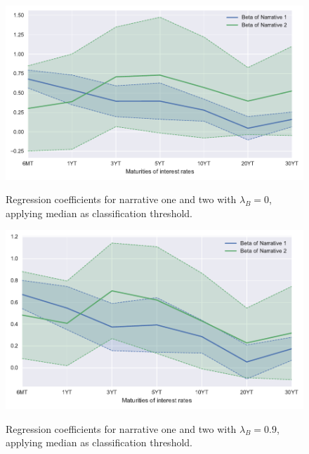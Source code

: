 \documentclass[11pt,a4paper,english,oneside]{book}
\numberwithin{equation}{chapter}
\begin{document}
\begin{figure}
	\caption{Regression coefficients for narrative one and two with $\lambda_B=0$, applying median as classification threshold.}
	\centering
	\includegraphics[scale=1]{Images/betasLambMod0_0.pdf}
	\label{betaModL00}
\end{figure}


\begin{figure}
	\caption{Regression coefficients for narrative one and two with $\lambda_B=0.9$, applying median as classification threshold.}
	\centering
	\includegraphics[scale=1]{Images/betasLambMod0_9.pdf}
	\label{betaModL09}
\end{figure}
\end{document}
